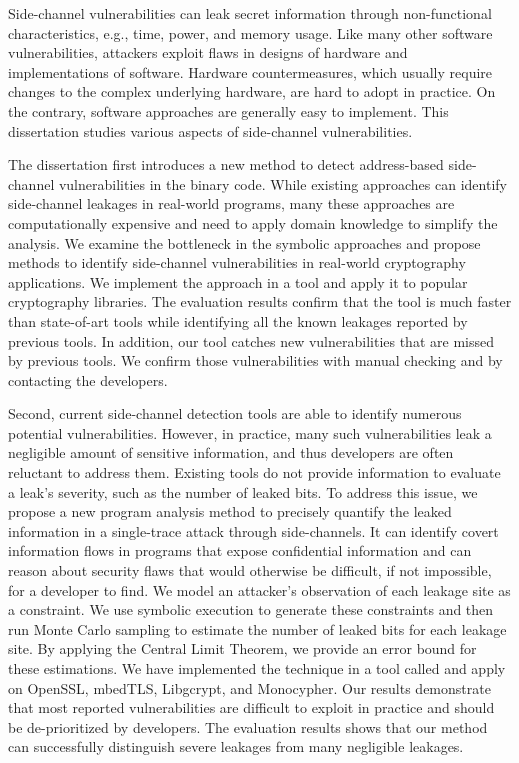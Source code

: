 
Side-channel vulnerabilities can leak secret information through non-functional characteristics, e.g., time, power, and memory usage. Like many other software vulnerabilities, attackers exploit flaws in designs of hardware and implementations of software. Hardware countermeasures, which usually require changes to the complex underlying hardware, are hard to adopt in practice. On the contrary, software approaches are generally easy to implement. This dissertation studies various aspects of side-channel vulnerabilities.

The dissertation first introduces a new method to detect address-based side-channel vulnerabilities in the binary code. While existing approaches can identify side-channel leakages in real-world programs, many these approaches are computationally expensive and need to apply domain knowledge to simplify the analysis.  We examine the bottleneck in the symbolic approaches and propose methods to identify side-channel vulnerabilities in real-world cryptography applications. We implement the approach in a tool and apply it to popular cryptography libraries. The evaluation results confirm that the tool is much faster than state-of-art tools while identifying all the known leakages reported by previous tools. In addition, our tool catches new vulnerabilities that are missed by previous tools. We confirm those vulnerabilities with manual checking and by contacting the developers.

Second, current side-channel detection tools are able to identify numerous potential vulnerabilities. However, in practice, many such vulnerabilities leak a negligible amount of sensitive information, and thus developers are often reluctant to address them. Existing tools do not provide information to evaluate a leak’s severity, such as the number of leaked bits. To address this issue, we propose a new program analysis method to precisely quantify the leaked information in a single-trace attack through side-channels. It can identify covert information flows in programs that expose confidential information and can reason about security flaws that would otherwise be difficult, if not impossible, for a developer to find. We model an attacker’s observation of each leakage site as a constraint. We use symbolic execution to generate these constraints and then run Monte Carlo sampling to estimate the number of leaked bits for each leakage site. By applying the Central Limit Theorem, we provide an error bound for these estimations. We have implemented the technique in a tool called \tool{} and apply \tool{} on OpenSSL, mbedTLS, Libgcrypt, and Monocypher. Our results demonstrate that most reported vulnerabilities are difficult to exploit in practice and should be de-prioritized by developers. The evaluation results shows that our method can successfully distinguish severe leakages from many negligible leakages. 

